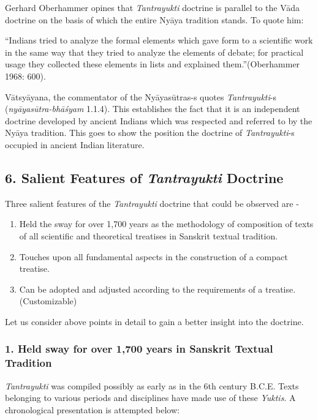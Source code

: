 Gerhard Oberhammer opines that \textit{Tantrayukti} doctrine is parallel to the Vāda doctrine on the basis of which the entire Nyāya tradition stands. To quote him:

“Indians tried to analyze the formal elements which gave form to a scientific work in the same way that they tried to analyze the elements of debate; for practical usage they collected these elements in lists and explained them.”\hfill (Oberhammer 1968: 600).

Vātsyāyana, the commentator of the Nyāyasūtras-s quotes \textit{Tantrayukti}-s (\textit{nyāyasūtra-bhāśyam} 1.1.4). This establishes the fact that it is an independent doctrine developed by ancient Indians which was respected and referred to by the Nyāya tradition. This goes to show the position the doctrine of \textit{Tantrayukti}-s occupied in ancient Indian literature.


\subsection*{6. Salient Features of \textit{Tantrayukti} Doctrine}

Three salient features of the \textit{Tantrayukti} doctrine that could be observed are -

\begin{enumerate}[{\rm 1.}]
\itemsep=0pt
\item Held the sway for over 1,700 years as the methodology of composition of texts of all scientific and theoretical treatises in Sanskrit textual tradition.

 \item Touches upon all fundamental aspects in the construction of a compact treatise.

 \item Can be adopted and adjusted according to the requirements of a treatise. (Customizable)

\end{enumerate}

Let us consider above points in detail to gain a better insight into the doctrine.

\subsubsection*{1. Held sway for over 1,700 years in Sanskrit Textual Tradition}

\textit{Tantrayukti} was compiled possibly as early as in the 6th century B.C.E. Texts belonging to various periods and disciplines have made use of these \textit{Yuktis}. A chronological presentation is attempted below:

